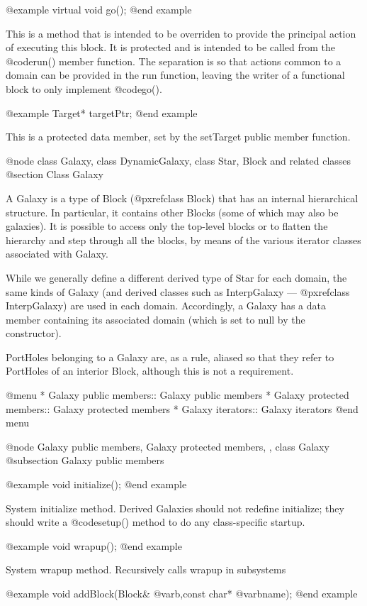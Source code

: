 @example
virtual void go();
@end example

This is a method that is intended to be overriden to provide the
principal action of executing this block.  It is protected and is
intended to be called from the @code{run()} member function.  The
separation is so that actions common to a domain can be provided
in the run function, leaving the writer of a functional block to
only implement @code{go()}.

@example
Target* targetPtr;
@end example

This is a protected data member, set by the setTarget public member
function.

@node class Galaxy, class DynamicGalaxy, class Star, Block and related classes
@section Class Galaxy

A Galaxy is a type of Block (@pxref{class Block})
that has an internal hierarchical structure.
In particular, it contains other Blocks (some of which may also be
galaxies).  It is possible to access only the top-level blocks or to
flatten the hierarchy and step through all the blocks, by means
of the various iterator classes associated with Galaxy.

While we generally define a different derived type of Star for each
domain, the same kinds of Galaxy (and derived classes such as
InterpGalaxy --- @pxref{class InterpGalaxy})
are used in each domain.  Accordingly,
a Galaxy has a data member containing its associated domain (which
is set to null by the constructor).

PortHoles belonging to a Galaxy are, as a rule, aliased so that they
refer to PortHoles of an interior Block, although this is not a
requirement.

@menu
* Galaxy public members::  Galaxy public members
* Galaxy protected members::  Galaxy protected members
* Galaxy iterators::  Galaxy iterators
@end menu

@node Galaxy public members, Galaxy protected members,  , class Galaxy
@subsection Galaxy public members

@example
void initialize();
@end example

System initialize method.  Derived Galaxies should not redefine
initialize; they should write a @code{setup()} method to do any
class-specific startup.

@example
void wrapup();
@end example

System wrapup method.  Recursively calls wrapup in subsystems

@example
void addBlock(Block& @var{b},const char* @var{bname});
@end example

